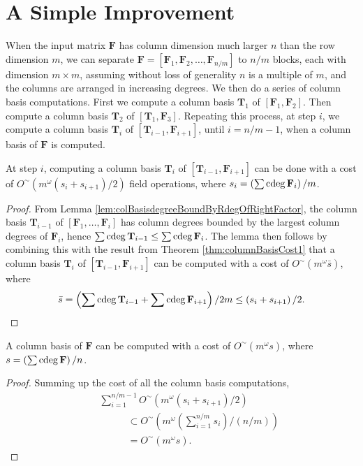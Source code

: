 
\section{\label{sec:successiveColBasisComputation}A Simple Improvement}

When the input matrix $\mathbf{F}$ has column dimension much larger
$n$ than the row dimension $m$, we can separate $\mathbf{F}=\left[\mathbf{F}_{1},\mathbf{F}_{2},\dots,\mathbf{F}_{n/m}\right]$
to $n/m$ blocks, each with dimension $m\times m$, assuming without
loss of generality $n$ is a multiple of $m$, and the columns are
arranged in increasing degrees. We then do a series of column basis
computations. First we compute a column basis $\mathbf{T}_{1}$ of
$\left[\mathbf{F}_{1},\mathbf{F}_{2}\right]$. Then compute a column
basis $\mathbf{T}_{2}$ of $\left[\mathbf{T}_{1},\mathbf{F}_{3}\right]$.
Repeating this process, at step $i$, we compute a column basis $\mathbf{T}_{i}$
of $\left[\mathbf{T}_{i-1},\mathbf{F}_{i+1}\right]$, until $i=n/m-1$,
when a column basis of $\mathbf{F}$ is computed. 
\begin{lem}
At step $i$, computing a column basis $\mathbf{T}_{i}$ of $\left[\mathbf{T}_{i-1},\mathbf{F}_{i+1}\right]$
can be done with a cost of $O^{\sim}\left(m^{\omega}(s_{i}+s_{i+1})/2\right)$
field operations, where $s_{i}=\left(\sum{\rm cdeg}\,\mathbf{F}_{i}\right)/m$.\end{lem}
\begin{proof}
From Lemma \ref{lem:colBasisdegreeBoundByRdegOfRightFactor}, the
column basis $\mathbf{T}_{i-1}$ of $\left[\mathbf{F}_{1},\dots,\mathbf{F}_{i}\right]$
has column degrees bounded by the largest column degrees of $\mathbf{F}_{i}$,
hence $\sum{\rm cdeg}\,\mathbf{T}_{i-1}\le\sum{\rm cdeg}\,\mathbf{F}_{i}$. The
lemma then follows by combining this with the result from Theorem
\ref{thm:columnBasisCost1} that a column basis $\mathbf{T}_{i}$
of $\left[\mathbf{T}_{i-1},\mathbf{F}_{i+1}\right]$ can be computed
with a cost of $O^{\sim}\left(m^{\omega}\bar{s}\right)$, where 
\[
\bar{s}=\left(\sum{\rm cdeg}\,\mathbf{T}_{i-1}+\sum{\rm cdeg}\,\mathbf{F}_{i+1}\right)/2m\le\left(s_{i}+s_{i+1}\right)/2.
\]
 \end{proof}
\begin{thm}
\label{thm:finalCollBasisCost}A column basis of $\mathbf{F}$ can
be computed with a cost of $O^{\sim}\left(m^{\omega}s\right)$, where
$s=\left(\sum{\rm cdeg}\,\mathbf{F}\right)/n$.\end{thm}
\begin{proof}
Summing up the cost of all the column basis computations, 
\begin{eqnarray*}
 &  & \sum_{i=1}^{n/m-1}O^{\sim}\left(m^{\omega}\left(s_{i}+s_{i+1}\right)/2\right)\\
 &  & ~~~~~~~~~~~~~\subset O^{\sim}\left(m^{\omega}\left(\sum_{i=1}^{n/m}s_{i}\right)/(n/m)\right)\\
 &  & ~~~~~~~~~~~~~=O^{\sim}\left(m^{\omega}s\right).
\end{eqnarray*}
\end{proof}
